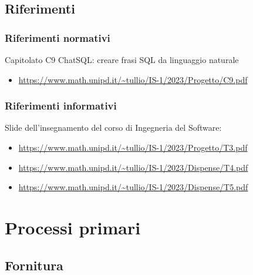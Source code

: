 \documentclass{article}
\begin{document}
\subsection{Riferimenti}
\subsubsection{Riferimenti normativi}
Capitolato C9 ChatSQL: creare frasi SQL da linguaggio naturale
\begin{itemize}
    \item \url{https://www.math.unipd.it/~tullio/IS-1/2023/Progetto/C9.pdf}
\end{itemize}

\subsubsection{Riferimenti informativi}
Slide dell’insegnamento del corso di Ingegneria del Software:
\begin{itemize}
\item \url{https://www.math.unipd.it/~tullio/IS-1/2023/Progetto/T3.pdf}
\item \url{https://www.math.unipd.it/~tullio/IS-1/2023/Dispense/T4.pdf}
\item \url{https://www.math.unipd.it/~tullio/IS-1/2023/Dispense/T5.pdf}
\end{itemize}
\section{Processi primari}
\subsection{Fornitura}
\end{document}
